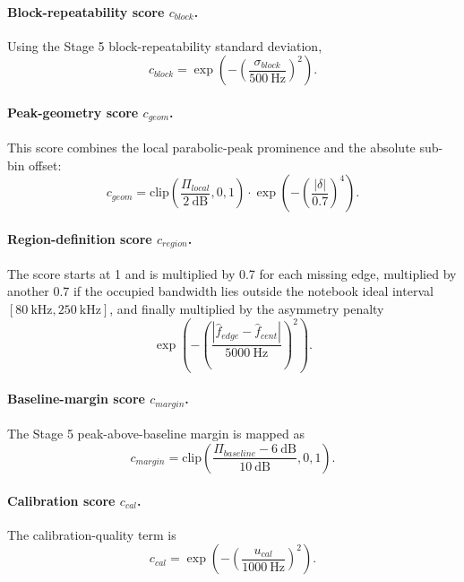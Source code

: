 \documentclass[11pt]{article}
\begin{document}
\paragraph{Block-repeatability score $c_{block}$.}
Using the Stage 5 block-repeatability standard deviation,
\begin{equation}
c_{block} = \exp\left(-\left(\frac{\sigma_{block}}{500~\text{Hz}}\right)^2\right).
\end{equation}

\paragraph{Peak-geometry score $c_{geom}$.}
This score combines the local parabolic-peak prominence and the absolute sub-bin offset:
\begin{equation}
c_{geom} = \text{clip}\left(\frac{\Pi_{local}}{2~\text{dB}}, 0, 1\right) \cdot \exp\left(-\left(\frac{|\delta|}{0.7}\right)^4\right).
\end{equation}

\paragraph{Region-definition score $c_{region}$.}
The score starts at 1 and is multiplied by 0.7 for each missing edge, multiplied by another 0.7 if the occupied bandwidth lies outside the notebook ideal interval $[80~\text{kHz}, 250~\text{kHz}]$, and finally multiplied by the asymmetry penalty
\begin{equation}
\exp\left(-\left(\frac{|\hat{f}_{edge} - \hat{f}_{cent}|}{5000~\text{Hz}}\right)^2\right).
\end{equation}

\paragraph{Baseline-margin score $c_{margin}$.}
The Stage 5 peak-above-baseline margin is mapped as
\begin{equation}
c_{margin} = \text{clip}\left(\frac{\Pi_{baseline} - 6~\text{dB}}{10~\text{dB}}, 0, 1\right).
\end{equation}

\paragraph{Calibration score $c_{cal}$.}
The calibration-quality term is
\begin{equation}
c_{cal} = \exp\left(-\left(\frac{u_{cal}}{1000~\text{Hz}}\right)^2\right).
\end{equation}
\end{document}
